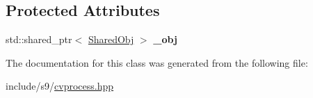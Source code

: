\subsection*{Protected Attributes}
\begin{DoxyCompactItemize}
\item 
\hypertarget{classs9_1_1compvis_1_1Process_a3c7111cbde85ba9a894a7613d1fbb24e}{std\-::shared\-\_\-ptr$<$ \hyperlink{structs9_1_1compvis_1_1Process_1_1SharedObj}{Shared\-Obj} $>$ {\bfseries \-\_\-obj}}\label{classs9_1_1compvis_1_1Process_a3c7111cbde85ba9a894a7613d1fbb24e}

\end{DoxyCompactItemize}


The documentation for this class was generated from the following file\-:\begin{DoxyCompactItemize}
\item 
include/s9/\hyperlink{cvprocess_8hpp}{cvprocess.\-hpp}\end{DoxyCompactItemize}
